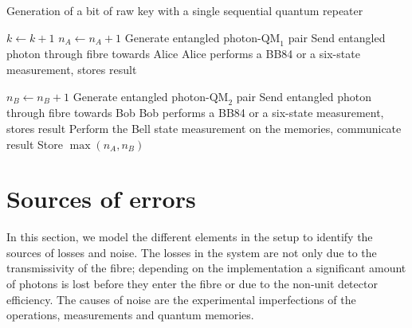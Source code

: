 \documentclass[aps,pra,reprint,superscriptaddress]{revtex4-1}
\newcommand{\nstar}{n^{\star}}
\begin{document}
{\centering
\begin{minipage}{.85\linewidth}
\begin{algorithm}[H]
\caption{Generation of a bit of raw key with a single sequential quantum repeater }\label{algorithm:protocol}
\begin{algorithmic}[1]
\Loop	
	\State $k\gets k+1$ 
	\Repeat	
		\State $n_A\gets n_A + 1$ 
		\State Generate entangled photon-$\textrm{QM}_1$ pair 
		\State Send entangled photon through fibre towards Alice
	\State Alice performs a BB84 or a six-state measurement, stores result
	
	\Repeat 
		\State $n_B\gets n_B + 1$ 
		\State Generate entangled photon-$\textrm{QM}_2$ pair 
		\State Send entangled photon through fibre towards Bob
	\Until{Bob receives photon or $n_B = k\nstar$}
	 	\State Bob performs a BB84 or a six-state measurement, stores result
		\State Perform the Bell state measurement on the memories, communicate result
		\State Store $\max(n_A,n_B)$ 
		\State \Return
	\EndIf
\EndLoop
\end{algorithmic}
\end{algorithm}
\end{minipage}
\par
}






\section{Sources of errors}
\label{sec:sources}
In this section, we model the different elements in the setup to identify the sources of losses and noise. The losses in the system are not only due to the transmissivity of the fibre; depending on the implementation a significant amount of photons is lost before they enter the fibre or due to the non-unit detector efficiency. The causes of noise are the experimental imperfections of the operations, measurements and quantum memories.
\end{document}

